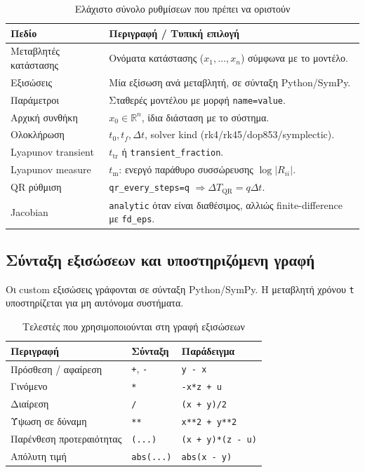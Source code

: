 \documentclass[11pt,a4paper]{report}
\begin{document}
\begin{table}[H]
\centering
\caption{Ελάχιστο σύνολο ρυθμίσεων που πρέπει να οριστούν}
\label{tab:ch2-min-settings}
\renewcommand{\arraystretch}{1.15}
\begin{tabular}{|p{}|p{}|}
\hline
\textbf{Πεδίο} & \textbf{Περιγραφή / Τυπική επιλογή} \\
\hline
Μεταβλητές κατάστασης & Ονόματα κατάστασης ($x_1,\dots,x_n$) σύμφωνα με το μοντέλο. \\
\hline
Εξισώσεις & Μία εξίσωση ανά μεταβλητή, σε σύνταξη Python/SymPy. \\
\hline
Παράμετροι & Σταθερές μοντέλου με μορφή \texttt{name=value}. \\
\hline
Αρχική συνθήκη & $x_0 \in \mathbb{R}^n$, ίδια διάσταση με το σύστημα. \\
\hline
Ολοκλήρωση & $t_0, t_f, \Delta t$, solver kind (rk4/rk45/dop853/symplectic). \\
\hline
Lyapunov transient & $t_{\mathrm{tr}}$ ή \texttt{transient\_fraction}. \\
\hline
Lyapunov measure & $t_{\mathrm{m}}$: ενεργό παράθυρο συσσώρευσης $\log |R_{ii}|$. \\
\hline
QR ρύθμιση & \texttt{qr\_every\_steps=q} $\Rightarrow \Delta T_{\mathrm{QR}} = q\Delta t$. \\
\hline
Jacobian & \texttt{analytic} όταν είναι διαθέσιμος, αλλιώς finite-difference με \texttt{fd\_eps}. \\
\hline
\end{tabular}
\end{table}

\subsection{Σύνταξη εξισώσεων και υποστηριζόμενη γραφή}
\label{subsec:equation-syntax}

Οι custom εξισώσεις γράφονται σε σύνταξη Python/SymPy. Η μεταβλητή χρόνου \texttt{t} υποστηρίζεται για μη αυτόνομα συστήματα.

\begin{table}[H]
\centering
\caption{Τελεστές που χρησιμοποιούνται στη γραφή εξισώσεων}
\label{tab:ch2-operators}
\renewcommand{\arraystretch}{1.15}
\begin{tabular}{|p{}|p{}|p{}|}
\hline
\textbf{Περιγραφή} & \textbf{Σύνταξη} & \textbf{Παράδειγμα} \\
\hline
Πρόσθεση / αφαίρεση & \texttt{+}, \texttt{-} & \texttt{y - x} \\
\hline
Γινόμενο & \texttt{*} & \texttt{-x*z + u} \\
\hline
Διαίρεση & \texttt{/} & \texttt{(x + y)/2} \\
\hline
Ύψωση σε δύναμη & \texttt{**} & \texttt{x**2 + y**2} \\
\hline
Παρένθεση προτεραιότητας & \texttt{(...)} & \texttt{(x + y)*(z - u)} \\
\hline
Απόλυτη τιμή & \texttt{abs(...)} & \texttt{abs(x - y)} \\
\hline
\end{tabular}
\end{table}
\end{document}

